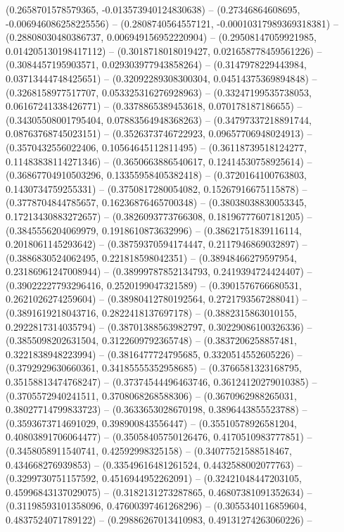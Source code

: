 \begin{scope}[blend group = overlay]
(0.2658701578579365, -0.013573940124830638) -- 
(0.27346864608695, -0.006946086258225556) -- 
(0.2808740564557121, -0.00010317989369318381) -- 
(0.28808030480386737, 0.006949156952220904) -- 
(0.29508147059921985, 0.014205130198417112) -- 
(0.3018718018019427, 0.021658778459561226) -- 
(0.3084457195903571, 0.029303977943858264) -- 
(0.3147978229443984, 0.03713444748425651) -- 
(0.32092289308300304, 0.04514375369894848) -- 
(0.3268158977517707, 0.053325316276928963) -- 
(0.33247199535738053, 0.06167241338426771) -- 
(0.3378865389453618, 0.070178187186655) -- 
(0.34305508001795404, 0.07883564948368263) -- 
(0.34797337218891744, 0.08763768745023151) -- 
(0.3526373746722923, 0.09657706948024913) -- 
(0.3570432556022406, 0.10564645112811495) -- 
(0.36118739518124277, 0.11483838114271346) -- 
(0.3650663886540617, 0.12414530758925614) -- 
(0.36867704910503296, 0.13355958405382418) -- 
(0.3720164100763803, 0.1430734759255331) -- 
(0.3750817280054082, 0.15267916675115878) -- 
(0.3778704844785657, 0.16236876465700348) -- 
(0.38038038830053345, 0.17213430883272657) -- 
(0.3826093773766308, 0.18196777607181205) -- 
(0.3845556204069979, 0.1918610873632996) -- 
(0.38621751839116114, 0.2018061145293642) -- 
(0.38759370594174447, 0.2117946869032897) -- 
(0.3886830524062495, 0.221818598042351) -- 
(0.38948466279597954, 0.23186961247008944) -- 
(0.38999787852134793, 0.2419394724424407) -- 
(0.39022227793296416, 0.2520199047321589) -- 
(0.3901576766680531, 0.2621026274259604) -- 
(0.38980412780192564, 0.2721793567288041) -- 
(0.3891619218043716, 0.2822418137697178) -- 
(0.3882315863010155, 0.2922817314035794) -- 
(0.38701388563982797, 0.30229086100326336) -- 
(0.3855098202631504, 0.3122609792365748) -- 
(0.3837206258857481, 0.3221838948223994) -- 
(0.3816477724795685, 0.3320514552605226) -- 
(0.3792929630660361, 0.34185555352958685) -- 
(0.3766581323168795, 0.35158813474768247) -- 
(0.37374544496463746, 0.36124120279010385) -- 
(0.3705572940241511, 0.3708068268588306) -- 
(0.3670962988265031, 0.38027714799833723) -- 
(0.3633653028670198, 0.3896443855523788) -- 
(0.3593673714691029, 0.398900843556447) -- 
(0.35510578926581204, 0.40803891706064477) -- 
(0.35058405750126476, 0.4170510983777851) -- 
(0.3458058911540741, 0.42592998325158) -- 
(0.34077521588518467, 0.434668276939853) -- 
(0.33549616481261524, 0.4432588002077763) -- 
(0.3299730751157592, 0.4516944952262091) -- 
(0.32421048447203105, 0.45996843137029075) -- 
(0.3182131273287865, 0.46807381091352634) -- 
(0.31198593101358096, 0.47600397461268296) -- 
(0.3055340116859604, 0.4837524071789122) -- 
(0.29886267013410983, 0.49131274263060226) -- 

\end{scope}
